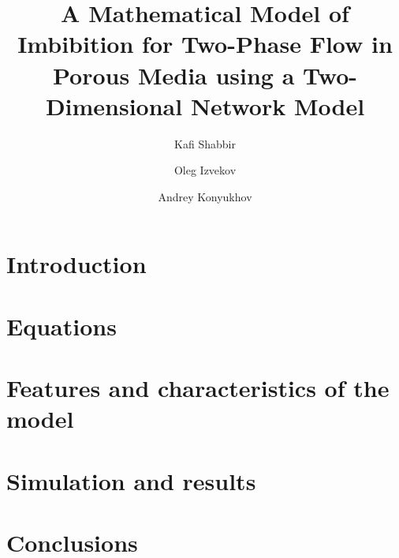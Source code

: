 \documentclass[
	12pt
] {article}
\title{A Mathematical Model of Imbibition for Two-Phase Flow in Porous Media using a Two-Dimensional Network Model}
\author[1]{Kafi Shabbir}
\author[1]{Oleg Izvekov}
\author[1]{Andrey Konyukhov}
\affil[1]{Moscow Institute of Physics and Technology}
\begin{document}
	\nocite{*}
	\maketitle
	
	\begin{abstract}
		
	\end{abstract}
		
	\section{Introduction}
		
		
	\section{Equations}
		
		
	\section{Features and characteristics of the model}
		

	\section{Simulation and results}
		

	\section{Conclusions}
		
		
	
	
		
\end{document}
